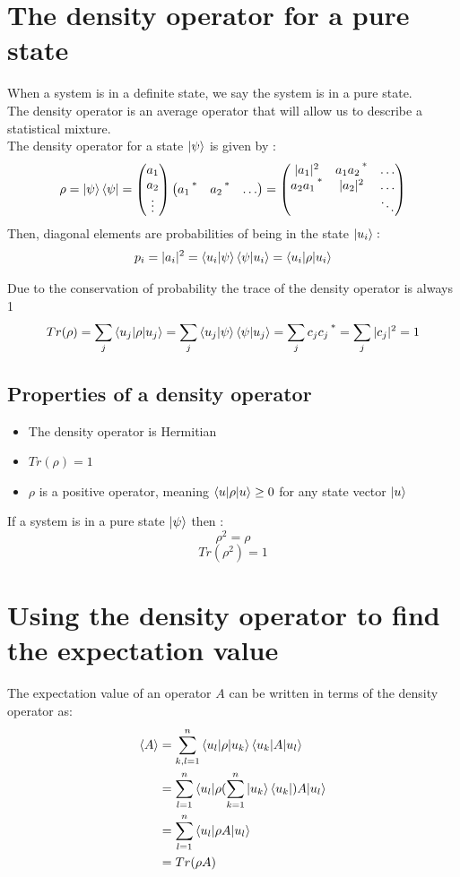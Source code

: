 \documentclass[12pt,oneside]{book}
\begin{document}
\section{The density operator for a pure state}
When a system is in a definite state, we say the system is in a pure state.\\
The density operator is an average operator that will allow us to describe a statistical mixture.\\
The density operator for a state $\ket{\psi}$ is given by :
\[ \rho = \ket{\psi}\bra{\psi} =  \left( \begin{matrix}
 a_1 \\ 
 a_2 \\ 
 \vdots 
\end{matrix}\right)  \left( \begin{matrix}
 a_1\operatorname{^*}&a_2\operatorname{^*}  &\hdots  \\ 
\end{matrix}\right) =  \left( \begin{matrix}
 |a_1|^2&a_1a_2\operatorname{^*}  & \hdots  \\ 
 a_2a_1\operatorname{^*}&|a_2|^2  & \hdots  \\ 
&  & \ddots
\end{matrix}\right) \]
Then, diagonal elements are probabilities of being in the state $\ket{u_i} :$
\[p_i = |a_i|^2 = \braket{u_i|\psi}\braket{\psi|u_i} = \braket{u_i|\rho|u_i}\]

Due to the conservation of probability the trace of the density operator is always 1
\[Tr(\rho) = \sum_j\braket{u_j|\rho|u_j} = \sum_j\braket{u_j|\psi}\braket{\psi|u_j} =\sum_jc_jc_j\operatorname{^*} = \sum_j|c_j|^2 = 1\]
\subsection{Properties of a density operator}
\begin{itemize}
    \item The density operator is Hermitian
    \item $Tr(\rho) =1$
    \item $\rho$ is a positive operator, meaning $\braket{u|\rho|u} \geq 0$ for any state vector $\ket{u}$
\end{itemize}
If a system is in a pure state $\ket{\psi}$ then :
\[\rho^2 = \rho\]
\[ Tr(\rho^2) =1 \]
\section{Using the density operator to find the expectation value}
The expectation value of an operator $A$ can be written in terms of the density operator as:
\begin{align*}
    \langle A \rangle & = \sum_{k,l = 1}^n \braket{u_l|\rho|u_k}\braket{u_k|A|u_l}              \\
                & = \sum_{l=1}^n\braket{u_l|\rho ( \sum_{k=1}^n \ket{u_k}\bra{u_k})A|u_l} \\
                & = \sum_{l=1}^n\braket{u_l|\rho A|u_l}                                   \\
                & = Tr(\rho A)
\end{align*}
\end{document}
